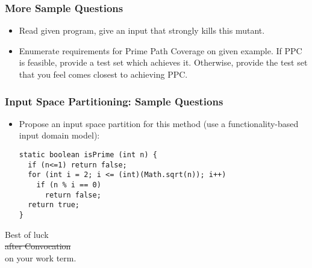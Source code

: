 \documentclass{beamer}
\newenvironment{changemargin}[1]{%
  \begin{list}{}{%
    \setlength{\topsep}{0pt}%
    \setlength{\leftmargin}{#1}%
    \setlength{\rightmargin}{1em}
    \setlength{\listparindent}{\parindent}%
    \setlength{\itemindent}{\parindent}%
    \setlength{\parsep}{\parskip}%
  }%
  \item[]}{\end{list}}
\begin{document}
\begin{frame}
  \frametitle{More Sample Questions}
\begin{changemargin}{1cm}
\begin{itemize}
\item Read given program, give an input that
strongly kills this mutant.
\item Enumerate requirements for Prime Path
Coverage on given example. If PPC is feasible,
provide a test set which achieves it. Otherwise,
provide the test set that you feel comes closest
to achieving PPC.
\end{itemize}
\end{changemargin}
\end{frame}


\begin{frame}[fragile]
  \frametitle{Input Space Partitioning: Sample Questions}
\begin{changemargin}{1cm}
\begin{itemize}
\item Propose an input space partition for this method
(use a functionality-based input domain model):
\begin{lstlisting}
static boolean isPrime (int n) {
  if (n<=1) return false;
  for (int i = 2; i <= (int)(Math.sqrt(n)); i++)
    if (n % i == 0)
      return false;
  return true;
}
\end{lstlisting}
\end{itemize}
\end{changemargin}
\end{frame}

\begin{frame}
\begin{center}\Huge
Best of luck\\
 \alert{\sout{after Convocation}} \\ 
on your work term.
\end{center}
\end{frame}
\end{document}
